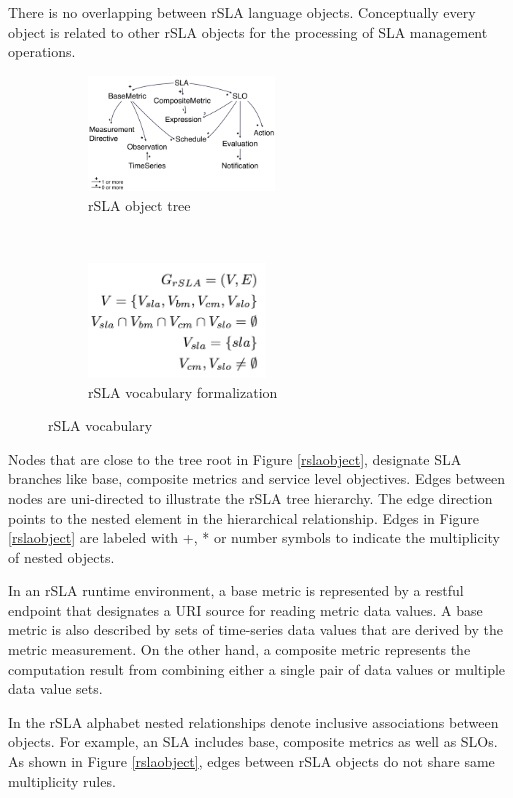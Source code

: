 There is no overlapping between rSLA language objects. Conceptually every object is related to other rSLA objects for the processing of SLA management operations. 

\begin{figure}
    \centering
    \begin{subfigure}
        \centering
        \includegraphics[height=1.2in]{pics/rslaobject}
        \caption{rSLA object tree}
    \end{subfigure}%
    ~ 
    \begin{subfigure}
        \centering
        \includegraphics[height=1.2in]{pics/rslagraph}
        \caption{rSLA vocabulary formalization}
    \end{subfigure}
    \caption{rSLA vocabulary}
\end{figure}

Nodes that are close to the tree root in Figure \ref{rslaobject}, designate SLA branches like base, composite metrics and service level objectives. Edges between nodes are uni-directed to illustrate the rSLA tree hierarchy. The edge direction points to the nested element in the hierarchical relationship. 
Edges in Figure \ref{rslaobject} are labeled with +, * or number symbols to indicate the multiplicity of nested objects. 

In an rSLA runtime environment, a base metric is represented by a restful endpoint that designates a URI source for reading metric data values. A base metric is also described by sets of time-series data values that are derived by the metric measurement. On the other hand, a composite metric represents the computation result from combining either a single pair of data values or multiple data value sets. 

In the rSLA alphabet nested relationships denote inclusive associations between objects. For example, an SLA includes base, composite metrics as well as SLOs. As shown in Figure \ref{rslaobject}, edges between  rSLA objects do not share same multiplicity rules. 

